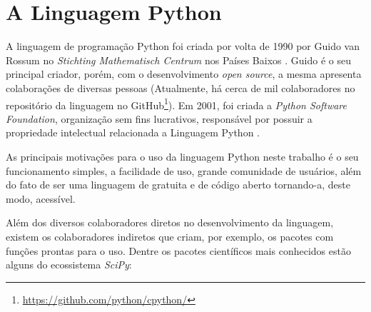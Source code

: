 \documentclass[
	12pt,				%
	openright,			%
    twoside,			%
	a4paper,			%
	english,			%
	french,				%
	spanish,			%
	brazil				%
	]{abntex2}
\numberwithin{lema}{chapter}
\numberwithin{teorema}{chapter}
\numberwithin{definicao}{chapter}
\numberwithin{exemplo}{chapter}
\numberwithin{figure}{chapter}
\begin{document}
\section{A Linguagem Python}



A linguagem de programação Python foi criada por volta de 1990 por Guido van Rossum no \textit{Stichting Mathematisch Centrum} nos Países Baixos \cite{Python_history}. Guido é o seu principal criador, porém, com o desenvolvimento \textit{open source}, a mesma apresenta colaborações de diversas pessoas (Atualmente, há cerca de mil colaboradores no repositório da linguagem no GitHub\footnote{\url{https://github.com/python/cpython/}}). Em 2001, foi criada a \textit{Python Software Foundation}, organização sem fins lucrativos, responsável por possuir a propriedade intelectual relacionada a Linguagem Python \cite{Python_history}.

As principais motivações para o uso da linguagem Python neste trabalho é o seu funcionamento simples, a facilidade de uso, grande comunidade de usuários, além do fato de ser uma linguagem de gratuita e de código aberto tornando-a, deste modo, acessível.

Além dos diversos colaboradores diretos no desenvolvimento da linguagem, existem os colaboradores indiretos que criam, por exemplo, os pacotes com funções prontas para o uso. Dentre os pacotes científicos mais conhecidos estão alguns do ecossistema \textit{SciPy}:
\end{document}

